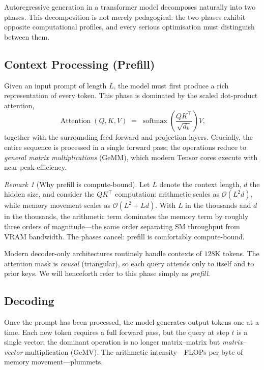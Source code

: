 \documentclass[11pt,a4paper]{article}
\theoremstyle{definition}
\theoremstyle{remark}
\newtheorem*{remark}{Remark}
\theoremstyle{plain}
\newcommand{\softmax}{\operatorname{softmax}}
\newcommand{\bigO}{\mathcal{O}}
\begin{document}
Autoregressive generation in a transformer model decomposes naturally into
two phases. This decomposition is not merely pedagogical: the two phases
exhibit opposite computational profiles, and every serious optimisation
must distinguish between them.

\subsection{Context Processing (Prefill)}

Given an input prompt of length $L$, the model must first produce a rich
representation of every token. This phase is dominated by the scaled
dot-product attention,
\begin{equation}
  \operatorname{Attention}(Q, K, V) \;=\; \softmax\!\left(\frac{QK^\top}{\sqrt{d_k}}\right) V,
  \label{eq:attention}
\end{equation}
together with the surrounding feed-forward and projection layers.
Crucially, the entire sequence is processed in a single forward pass; the
operations reduce to \emph{general matrix multiplications} (GeMM), which
modern Tensor cores execute with near-peak efficiency.

\begin{remark}[Why prefill is compute-bound]
Let $L$ denote the context length, $d$ the hidden size, and consider the
$QK^\top$ computation: arithmetic scales as $\bigO(L^2 d)$, while memory
movement scales as $\bigO(L^2 + Ld)$. With $L$ in the thousands and $d$ in
the thousands, the arithmetic term dominates the memory term by roughly
three orders of magnitude---the same order separating SM throughput from
VRAM bandwidth. The phases cancel: prefill is comfortably compute-bound.
\end{remark}

Modern decoder-only architectures routinely handle contexts of
$128\text{K}$ tokens. The attention mask is \emph{causal} (triangular), so
each query attends only to itself and to prior keys. We will henceforth
refer to this phase simply as \emph{prefill}.

\subsection{Decoding}

Once the prompt has been processed, the model generates output tokens one
at a time. Each new token requires a full forward pass, but the query at
step $t$ is a single vector: the dominant operation is no longer
matrix--matrix but \emph{matrix--vector} multiplication (GeMV). The
arithmetic intensity---FLOPs per byte of memory movement---plummets.
\end{document}
